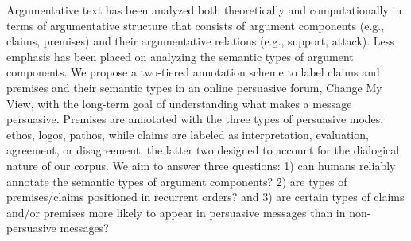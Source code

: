 Argumentative text has been analyzed both theoretically and computationally in terms of argumentative structure that consists of argument components (e.g., claims, premises) and their argumentative relations (e.g., support, attack). Less emphasis has been placed on analyzing the semantic types of argument components. We propose a two-tiered annotation scheme to label claims and premises and their semantic types in an online persuasive forum, Change My View, with the long-term goal of understanding what makes a message persuasive. Premises are annotated with the three types of persuasive modes: ethos, logos, pathos, while claims are labeled as interpretation, evaluation, agreement, or disagreement, the latter two designed to account for the dialogical nature of our corpus. We aim to answer three questions: 1) can humans reliably annotate the semantic types of argument components? 2) are types of premises/claims positioned in recurrent orders? and 3) are certain types of claims and/or premises more likely to appear in persuasive messages than in non-persuasive messages?
